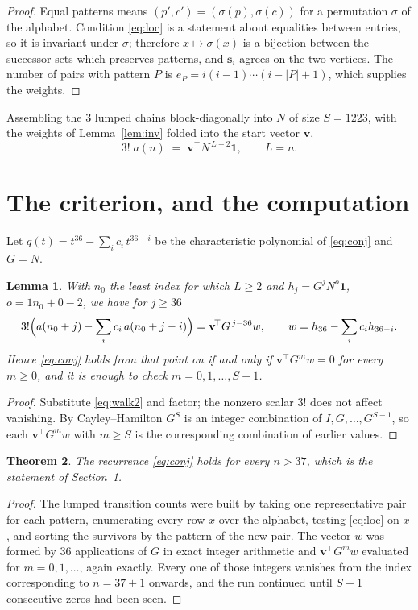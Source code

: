 \documentclass[11pt,a4paper]{article}
\theoremstyle{plain}
\newtheorem{theorem}{Theorem}
\newtheorem{lemma}[theorem]{Lemma}
\theoremstyle{definition}
\begin{document}
\begin{proof}
Equal patterns means $(p',c')=(\sigma(p),\sigma(c))$ for a permutation $\sigma$ of the
alphabet. Condition \eqref{eq:loc} is a statement about equalities between entries, so it is
invariant under $\sigma$; therefore $x\mapsto\sigma(x)$ is a bijection between the successor
sets which preserves patterns, and $\mathbf{s}_i$ agrees on the two vertices. The number of
pairs with pattern $P$ is $e_P=i(i-1)\cdots(i-|P|+1)$, which supplies the weights.
\end{proof}

Assembling the $3$ lumped chains block-diagonally into $N$ of size $S=1223$, with the
weights of Lemma~\ref{lem:inv} folded into the start vector $\mathbf{v}$,
\begin{equation}\label{eq:walk2}
3!\;a(n)\;=\;\mathbf{v}^{\!\top}N^{\,L-2}\mathbf{1},\qquad L=n .
\end{equation}

\section{The criterion, and the computation}

Let $q(t)=t^{36}-\sum_i c_i\,t^{36-i}$ be the characteristic polynomial of
\eqref{eq:conj} and $G=N$.

\begin{lemma}\label{lem:crit}
With $n_0$ the least index for which $L\ge2$ and $h_j=G^{j}N^{o}\mathbf{1}$,
$o=1n_0+0-2$, we have for $j\ge36$
\[
3!\Bigl(a(n_0+j)-\sum_i c_i\,a(n_0+j-i)\Bigr)
=\mathbf{v}^{\!\top}G^{\,j-36}w,\qquad
w=h_{36}-\sum_i c_i h_{36-i} .
\]
Hence \eqref{eq:conj} holds from that point on if and only if
$\mathbf{v}^{\!\top}G^{m}w=0$ for every $m\ge0$, and it is enough to check
$m=0,1,\dots,S-1$.
\end{lemma}

\begin{proof}
Substitute \eqref{eq:walk2} and factor; the nonzero scalar $3!$ does not affect
vanishing. By Cayley--Hamilton $G^{S}$ is an integer combination of $I,G,\dots,G^{S-1}$,
so each $\mathbf{v}^{\!\top}G^{m}w$ with $m\ge S$ is the corresponding combination of
earlier values.
\end{proof}

\begin{theorem}
The recurrence \eqref{eq:conj} holds for every $n>37$, which is the statement of
Section~1.
\end{theorem}

\begin{proof}
The lumped transition counts were built by taking one representative pair for each pattern,
enumerating every row $x$ over the alphabet, testing \eqref{eq:loc} on $x$, and sorting
the survivors by the pattern of the new pair. The vector $w$ was formed by $36$
applications of $G$ in exact integer arithmetic and $\mathbf{v}^{\!\top}G^{m}w$
evaluated for $m=0,1,\dots$, again exactly. Every one of those integers vanishes from the
index corresponding to $n=37+1$ onwards, and the run continued until $S+1$ consecutive
zeros had been seen.
\end{proof}
\end{document}
